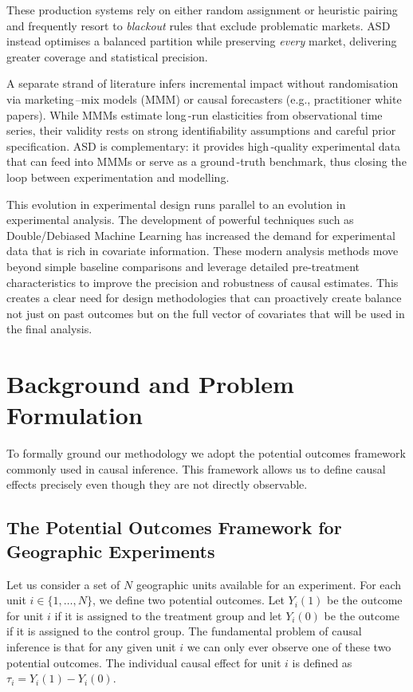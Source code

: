 \documentclass[final,3p,fleqn, 10pt]{elsarticle}
\begin{document}
These production systems rely on either random assignment or heuristic pairing and frequently resort to \emph{blackout} rules that exclude problematic markets. ASD instead optimises a balanced partition while preserving \emph{every} market, delivering greater coverage and statistical precision.

A separate strand of literature infers incremental impact without randomisation via marketing\,–mix models (MMM) or causal forecasters (e.g., practitioner white papers). While MMMs estimate long\,-run elasticities from observational time series, their validity rests on strong identifiability assumptions and careful prior specification. ASD is complementary: it provides high\,-quality experimental data that can feed into MMMs or serve as a ground\,-truth benchmark, thus closing the loop between experimentation and modelling.

This evolution in experimental design runs parallel to an evolution in experimental analysis. The development of powerful techniques such as Double/Debiased Machine Learning \citep{chernozhukov2018debiased} has increased the demand for experimental data that is rich in covariate information. These modern analysis methods move beyond simple baseline comparisons and leverage detailed pre-treatment characteristics to improve the precision and robustness of causal estimates. This creates a clear need for design methodologies that can proactively create balance not just on past outcomes but on the full vector of covariates that will be used in the final analysis.

\section{Background and Problem Formulation}
\label{sec:background}
To formally ground our methodology we adopt the potential outcomes framework commonly used in causal inference. This framework allows us to define causal effects precisely even though they are not directly observable.

    \subsection{The Potential Outcomes Framework for Geographic Experiments}
    Let us consider a set of $N$ geographic units available for an experiment. For each unit $i \in \{1, \dots, N\}$, we define two potential outcomes. Let $Y_i(1)$ be the outcome for unit $i$ if it is assigned to the treatment group and let $Y_i(0)$ be the outcome if it is assigned to the control group. The fundamental problem of causal inference is that for any given unit $i$ we can only ever observe one of these two potential outcomes. The individual causal effect for unit $i$ is defined as $\tau_i = Y_i(1) - Y_i(0)$.
\end{document}
